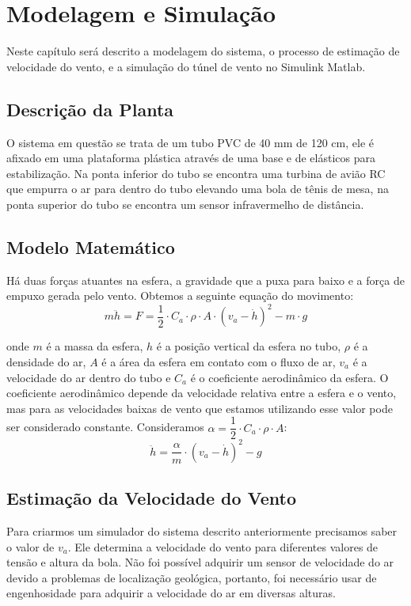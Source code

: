 \chapter{Modelagem e Simulação} \label{cap3}

Neste capítulo será descrito a modelagem do sistema, o processo de estimação de velocidade do vento, e a simulação do túnel de vento no Simulink Matlab.

\section{Descrição da Planta}
O sistema em questão se trata de um tubo PVC de 40 mm de 120 cm, ele é afixado em uma plataforma plástica através de uma base e de elásticos para estabilização. Na ponta inferior do tubo se encontra uma turbina de avião RC que empurra o ar para dentro do tubo elevando uma bola de tênis de mesa, na ponta superior do tubo se encontra um sensor infravermelho de distância.

\section{Modelo Matemático}



\label{fig:sistemasimples}

Há duas forças atuantes na esfera, a gravidade que a puxa para baixo e a força de empuxo gerada pelo vento. Obtemos a seguinte equação do movimento:
\begin{equation}
m \ddot{h}=F=\dfrac{1}{2} \cdot C_a \cdot\rho \cdot A \cdot (v_a- \dot{h})^2-m\cdot g
\end{equation}

onde $m$ é a massa da esfera, $h$ é a posição vertical da esfera no tubo, $\rho$ é a densidade do ar, $A$ é a área da esfera em contato com o fluxo de ar, $v_a$ é a velocidade do ar dentro do tubo e $C_a$ é o coeficiente aerodinâmico da esfera. O coeficiente aerodinâmico depende da velocidade relativa entre a esfera e o vento, mas para as velocidades baixas de vento que estamos utilizando esse valor pode ser considerado constante. Consideramos $\alpha= \dfrac{1}{2} \cdot C_a \cdot \rho \cdot A$:
\begin{equation} \label{eq:modelo}
\ddot{h}=\dfrac{\alpha}{m}\cdot (v_a-\dot{h})^2-g
\end{equation}

\section{Estimação da Velocidade do Vento}
Para criarmos um simulador do sistema descrito anteriormente precisamos saber o valor de $v_a$. Ele determina a velocidade do vento para diferentes valores de tensão e altura da bola. Não foi possível adquirir um sensor de velocidade do ar devido a problemas de localização geológica, portanto, foi necessário usar de engenhosidade para adquirir a velocidade do ar em diversas alturas.


